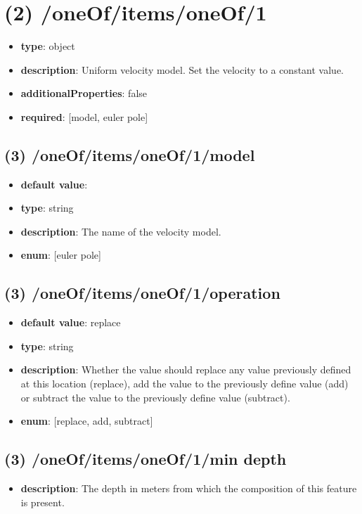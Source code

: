 \section{(2) /oneOf/items/oneOf/1}
\begin{itemize}[leftmargin=2em]\item {\bf type}: object
\item {\bf description}: Uniform velocity model. Set the velocity to a constant value.
\item {\bf additionalProperties}: false
\item {\bf required}: [model, euler pole]\end{itemize}
\subsection{(3) /oneOf/items/oneOf/1/model}
\begin{itemize}[leftmargin=3em]\item {\bf default value}: 
\item {\bf type}: string
\item {\bf description}: The name of the velocity model.
\item {\bf enum}: [euler pole]\end{itemize}\subsection{(3) /oneOf/items/oneOf/1/operation}
\begin{itemize}[leftmargin=3em]\item {\bf default value}: replace
\item {\bf type}: string
\item {\bf description}: Whether the value should replace any value previously defined at this location (replace), add the value to the previously define value (add) or subtract the value to the previously define value (subtract).
\item {\bf enum}: [replace, add, subtract]\end{itemize}\subsection{(3) /oneOf/items/oneOf/1/min depth}
\begin{itemize}[leftmargin=3em]\item {\bf description}: The depth in meters from which the composition of this feature is present.
\end{itemize}
